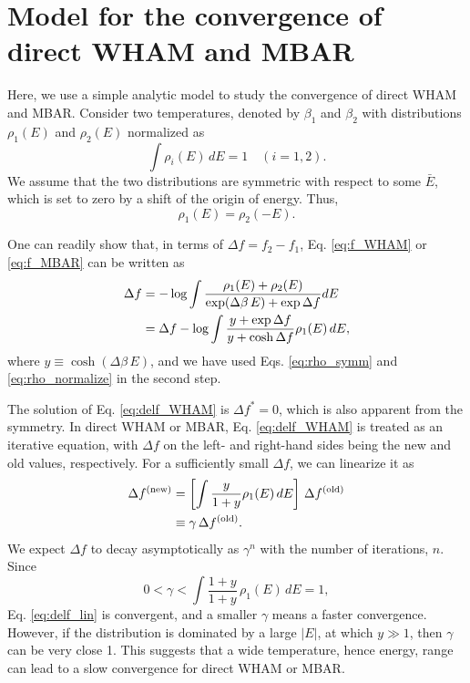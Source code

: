 \documentclass[reprint,aip,jcp,superscriptaddress]{revtex4-1}
\begin{document}
\section{\label{sec:convwham}
Model for the convergence of direct WHAM and MBAR}



Here, we use a simple analytic model
to study the convergence of direct WHAM and MBAR.
%
Consider two temperatures,
denoted by $\beta_1$ and $\beta_2$
with distributions $\rho_1(E)$ and $\rho_2(E)$
normalized as
%
\begin{equation}
\int \rho_i(E) \, dE
= 1
\quad
(i = 1, 2).
\label{eq:rho_normalize}
\end{equation}
%
We assume that the two distributions
are symmetric with respect to some $\bar E$,
which is set to zero
by a shift of the origin of energy.
%
Thus,
\begin{equation}
\rho_1(E)
=
\rho_2(-E).
\label{eq:rho_symm}
\end{equation}



One can readily show that,
in terms of $\Delta f = f_2 - f_1$,
Eq. \eqref{eq:f_WHAM} or \eqref{eq:f_MBAR}
can be written as
%
\begin{align}
\Delta f
&=
-\log \int
\frac{ \rho_1(E) + \rho_2(E) }
{ \exp(\Delta \beta \, E) + \exp \Delta f }
dE
\notag \\
&=
\Delta f
-
\log
  \int
    \frac{ y + \exp \Delta f }
         { y + \cosh \Delta f }
    \rho_1(E) \, dE,
\label{eq:delf_WHAM}
\end{align}
%
where $y \equiv \cosh(\Delta \beta \, E)$,
and we have used
Eqs. \eqref{eq:rho_symm} and
\eqref{eq:rho_normalize}
in the second step.



The solution of Eq. \eqref{eq:delf_WHAM}
is $\Delta f^* = 0$,
which is also apparent from the symmetry.
%
In direct WHAM or MBAR,
Eq. \eqref{eq:delf_WHAM}
is treated as an iterative equation,
with $\Delta f$
on the left- and right-hand sides
being the new and old values,
respectively.
%
For a sufficiently small $\Delta f$,
we can linearize it as
%
\begin{align}
\Delta f^\mathrm{(new)}
&=
\left[
  \int
    \frac{ y } { 1 + y }
    \rho_1(E) \, dE
\right] \,
\Delta f^\mathrm{(old)}
\notag\\
&\equiv
\gamma \,
\Delta f^\mathrm{(old)}.
\label{eq:delf_lin}
\end{align}
%
We expect
$\Delta f$
to decay asymptotically as $\gamma^n$
with the number of iterations, $n$.
%
Since
\[
0 < \gamma < \int
\frac{1 + y}
{1 + y}
\, \rho_1(E) \, dE = 1,
\]
Eq. \eqref{eq:delf_lin}
is convergent,
and a smaller $\gamma$ means
a faster convergence.
%
However,
if the distribution
is dominated by a large $|E|$,
at which $y \gg 1$,
%
then $\gamma$
can be very close 1.
%
This suggests that
a wide temperature, hence energy, range
can lead to a slow convergence
for direct WHAM or MBAR.





\end{document}

